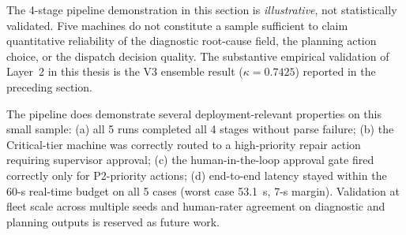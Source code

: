 The 4-stage pipeline demonstration in this section is \emph{illustrative}, not statistically validated. Five machines do not constitute a sample sufficient to claim quantitative reliability of the diagnostic root-cause field, the planning action choice, or the dispatch decision quality. The substantive empirical validation of Layer~2 in this thesis is the V3 ensemble result ($\kappa = 0.7425$) reported in the preceding section.

The pipeline does demonstrate several deployment-relevant properties on this small sample: (a) all 5 runs completed all 4 stages without parse failure; (b) the Critical-tier machine was correctly routed to a high-priority repair action requiring supervisor approval; (c) the human-in-the-loop approval gate fired correctly only for P2-priority actions; (d) end-to-end latency stayed within the 60-s real-time budget on all 5 cases (worst case 53.1~s, 7-s margin). Validation at fleet scale across multiple seeds and human-rater agreement on diagnostic and planning outputs is reserved as future work.
